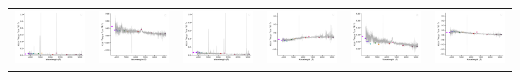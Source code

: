 \begin{center}
\begin{longtable}{l l l l l l }
    \includegraphics[width=0.3\linewidth, clip]{Figs/Figs-sdss/spec-0572-52289-0114-SPLUS-n04n01-004018.pdf} & \includegraphics[width=0.3\linewidth, clip]{Figs/Figs-sdss/spec-0573-52325-0471-SPLUS-n04n01-030147.pdf} & \includegraphics[width=0.3\linewidth, clip]{Figs/Figs-sdss/spec-0584-52049-0618-SPLUS-n05n50-017121.pdf} & \includegraphics[width=0.3\linewidth, clip]{Figs/Figs-sdss/spec-0669-52559-0359-STRIPE82-0004-022337.pdf} & \includegraphics[width=0.3\linewidth, clip]{Figs/Figs-sdss/spec-0673-52162-0547-STRIPE82-0140-024629.pdf} & \includegraphics[width=0.3\linewidth, clip]{Figs/Figs-sdss/spec-0674-52201-0135-SPLUS-s02s12-025538.pdf} \\

\end{longtable}
\end{center}
